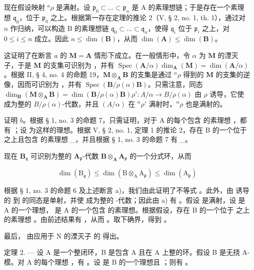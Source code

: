 现在假设映射 \({}^{a}\rho\) 是满射。设 \(\mathfrak{p}_0 \subset \ldots \subset \mathfrak{p}_n\) 是 A 的素理想链；于是存在一个素理想 \(\mathfrak{q}_0\)，位于 \(\mathfrak{p}_0\) 之上。根据第一存在定理的推论 2（V, § 2, no. 1, th. 1），通过对 \(n\) 作归纳，可以构造 B 的素理想链 \(\mathfrak{q}_0 \subset \ldots \subset \mathfrak{q}_n\)，使得 \(\mathfrak{q}_i\) 位于 \(\mathfrak{p}_i\) 之上，对 \(0 \leqslant i \leqslant n\) 成立。因此 \(n \leqslant \dim(\mathbf{B})\)，从而 \(\dim(\mathbf{A}) \leqslant \dim(\mathbf{B})\)。

这证明了在断言 \(a\) 的 \(\mathbf{M} = \mathbf{A}\) 情形下成立。在一般情形中，令 \(\alpha\) 为 \(\mathbf{M}\) 的湮灭子，于是 \(\mathbf{M}\) 的支集可识别为 ，并有 \(\operatorname{Spec}(\mathbf{A}/\alpha)\)\(\dim_{\mathbf{A}}(\mathbf{M}) = \dim(\mathbf{A}/\alpha)\)。根据 II, § 4, no. 4 的命题 19，\(\mathbf{M} \otimes_{\mathbf{A}} \mathbf{B}\) 的支集是通过 \(^{\alpha}\rho\) 得到的 \(\mathbf{M}\) 的支集的逆像，因而可识别为 ，并有 \(\operatorname{Spec}(\mathbf{B}/\rho(\alpha)\mathbf{B})\)。只需注意，同态 \(\dim_{\mathbf{B}}(\mathbf{M} \otimes_{\mathbf{A}} \mathbf{B}) = \dim(\mathbf{B}/\rho(\alpha)\mathbf{B})\)\(\rho': A/\alpha \to B/\rho(\alpha)\) 由 \(\rho\) 诱导，它使  成为整的 \(B/\rho(\alpha)\)-代数，并且 \((A/\alpha)\) 在 \(^{\alpha}\rho'\) 满射时，\(^{\alpha}\rho\) 也是满射的。

证明 \(b\)。根据 § 1, no. 3 的命题 7，只需证明，对于 A 的每个包含  的素理想  ，都有 ；设  为这样的理想。根据 V, § 2, no. 1, 定理 1 的推论 2，存在 B 的一个位于  之上且包含  的素理想 \_，并且根据 § 1, no. 3 的命题 7 有 \_。

现在 \(\mathbf{B}_{\mathfrak{q}}\) 可识别为整的 \(\mathbf{A}_{\mathfrak{p}}\)-代数 \(\mathbf{B} \otimes_{\mathbf{A}} \mathbf{A}_{\mathfrak{p}}\) 的一个分式环，从而

\[
\dim (\mathrm{B} _ {\mathfrak {q}}) \leqslant \dim (\mathrm{B} \otimes_ {\mathrm{A}} \mathrm{A} _ {\mathfrak {p}}) \leqslant \dim (\mathrm{A} _ {\mathfrak {p}})
\]

根据 § 1, no. 3 的命题 6 及上述断言 a)，我们由此证明了不等式 。此外，由  诱导的  到  的同态是单射，并使  成为整的 -代数；因此由 a) 有  。假设  是满射，设  是 A 的一个理想， 是 A 的一个包含  的素理想。根据假设，存在 B 的一个位于  之上的素理想  。由前述结果有  ，从而  。取下确界，得到  。

最后，  由应用于 N 的湮灭子  的  得出。

定理 2. --- 设 A 是一个整闭环，B 是包含 A 且在 A 上整的环。假设 B 是无挠 A-模。对 A 的每个理想  ，有 。设  是 B 的一个理想且 ；则有 。

